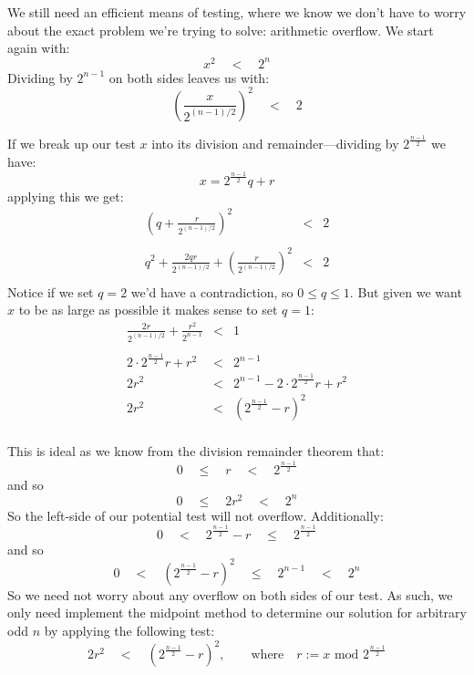 \documentclass[twoside]{article}
\newcommand{\lt}{\ensuremath{\quad < \quad}}
\renewcommand{\leq}{\ensuremath{\quad\le\quad}}
\begin{document}
We still need an efficient means of testing, where we know we don't have to worry about the exact problem
we're trying to solve: arithmetic overflow.  We start again with:
$$ x^2 \lt 2^n $$
Dividing by $ 2^{n-1} $ on both sides leaves us with:
$$ \left(\frac{x}{2^{(n-1)/2}}\right)^2 \lt 2 $$

If we break up our test $ x $ into its division and remainder---dividing by $ 2^\frac{n-1}{2} $ we have:
$$ x=2^\frac{n-1}{2}q+r $$
applying this we get:
$$ \begin{array}{rcl}
\left(q+\frac{r}{2^{(n-1)/2}}\right)^2 & < & 2 \\
 \\
q^2 + \frac{2qr}{2^{(n-1)/2}} + \left(\frac{r}{2^{(n-1)/2}}\right)^2 & < & 2 \\
\end{array} $$
Notice if we set $ q=2 $ we'd have a contradiction, so $ 0\le q\le 1 $. But given we want $ x $ to be as large as possible
it makes sense to set $ q=1 $:
$$ \begin{array}{rcl}
\frac{2r}{2^{(n-1)/2}} + \frac{r^2}{2^{n-1}} & < & 1 \\
 \\
2\cdot 2^\frac{n-1}{2}r + r^2 & < & 2^{n-1} \\
2r^2 & < & 2^{n-1} - 2\cdot 2^\frac{n-1}{2}r + r^2 \\
2r^2 & < & \left(2^\frac{n-1}{2} - r\right)^2 \\
\end{array} $$

This is ideal as we know from the division remainder theorem that:
$$ 0 \leq r \lt 2^\frac{n-1}{2} $$
and so
$$ 0 \leq 2r^2 \lt 2^n $$
So the left-side of our potential test will not overflow. Additionally:
$$ 0 \lt 2^\frac{n-1}{2}-r \leq 2^\frac{n-1}{2} $$
and so
$$ 0 \lt \left(2^\frac{n-1}{2}-r\right)^2 \leq 2^{n-1} \lt 2^n $$
So we need not worry about any overflow on both sides of our test.
As such, we only need implement the midpoint method to determine our solution for arbitrary odd $ n $
by applying the following test:
$$ 2r^2 \lt \left(2^\frac{n-1}{2} - r\right)^2,\qquad\mbox{where}\quad r := x\mbox{ mod } 2^\frac{n-1}{2} $$
\end{document}
